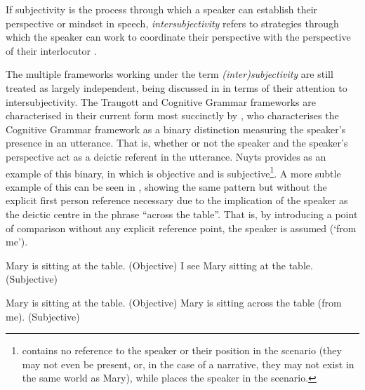 If subjectivity is the process through which a speaker can establish their perspective or mindset in speech, \textit{intersubjectivity} refers to strategies through which the speaker can work to coordinate their perspective with the perspective of their interlocutor \cite{Brems2014}.

The multiple frameworks working under the term \textit{(inter)subjectivity} are still treated as largely independent, being discussed in  in terms of their attention to intersubjectivity. The Traugott and Cognitive Grammar frameworks are characterised in their current form most succinctly by , who characterises the Cognitive Grammar framework as a binary distinction measuring the speaker's presence in an utterance. That is, whether or not the speaker and the speaker's perspective act as a deictic referent in the utterance. Nuyts provides  as an example of this binary, in which  is objective and  is subjective\footnote{ contains no reference to the speaker or their position in the scenario (they may not even be present, or, in the case of a narrative, they may not exist in the same world as Mary), while  places the speaker in the scenario.}. A more subtle example of this can be seen in , showing the same pattern but without the explicit first person reference necessary due to the implication of the speaker as the deictic centre in the phrase ``across the table''. That is, by introducing a point of comparison without any explicit reference point, the speaker is assumed (`from me').

\begin{exe}
\ex\label{ex:LangackerNuyts1}
\begin{xlist}
\ex Mary is sitting at the table. (Objective)\label{ex:LangackerNuyts1:Obj}
\ex I see Mary sitting at the table. (Subjective)\label{ex:LangackerNuyts1:Subj}
\end{xlist}
\cite[107]{Nuyts2015}
\end{exe}

\begin{exe}
\ex\label{ex:MyLangackerNuyts}
\begin{xlist}
\ex Mary is sitting at the table. (Objective)
\ex Mary is sitting across the table (from me). (Subjective)
\end{xlist}
\end{exe}

